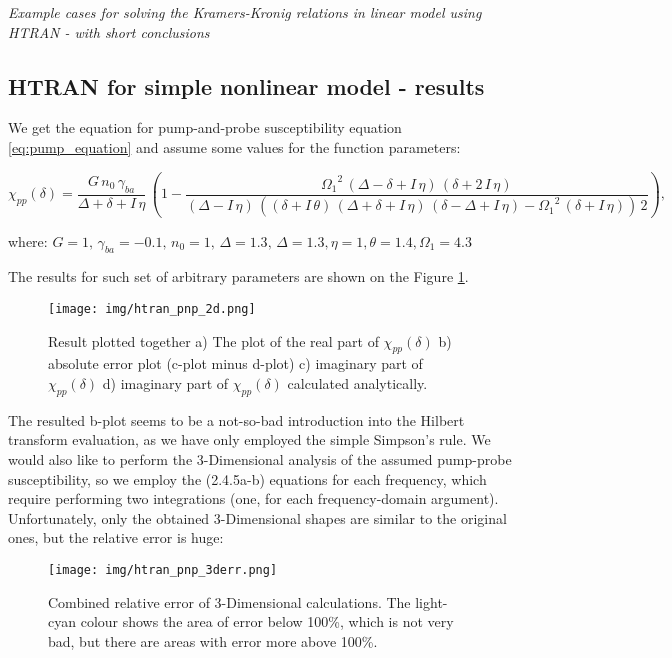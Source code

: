 \documentclass[12pt,twoside,a4paper]{article}
\numberwithin{equation}{subsection}
\numberwithin{figure}{subsection}
\begin{document}
\footnotesize{\textit{Example cases for solving the Kramers-Kronig relations in linear model using HTRAN - with short conclusions}}

\subsection{HTRAN for simple nonlinear model - results} \label{chap:htran_nlo}

We get the equation for pump-and-probe susceptibility equation \ref{eq:pump_equation} and assume some values for the function
parameters:

\begin{equation} \label{eq:htran_fparameters}
  {\chi_{pp}}(\delta )=\frac {G\,{n_{0}}\,{\gamma_{ba}}}{\Delta  + \delta  + I\,\eta } \, \left( \! 1 - \frac
  {{\Omega_{1}}^{2}\,(\Delta - \delta  + I\,\eta )\,(\delta  + 2\,I\,\eta )}{(\Delta  - I\,\eta )\,((\delta + I\,\theta )\,(\Delta 
  + \delta  + I\,\eta )\,(\delta - \Delta  + I\,\eta ) - {\Omega_{1}}^{2}\,(\delta  + I\,\eta ))\,2} \! \right) ,
\end{equation}

where: $G = 1,\,{\gamma_{ba}} = -0.1,\, {n_{0}} = 1,\,\Delta = 1.3,\,\Delta = 1.3,\eta = 1, \theta = 1.4, \Omega_{1} = 4.3$

The results for such set of arbitrary parameters are shown on the Figure \ref{fig:htran_pnp_2d}.

\begin{figure}
  \texttt{[image: img/htran\_pnp\_2d.png]}
  \caption{Result plotted together 
    a) The plot of the real part of $\chi_{pp} (\delta )$ 
    b) absolute error plot (c-plot minus d-plot) 
    c) imaginary part of $\chi_{pp} (\delta )$
    d) imaginary part of ${\chi_{pp}}(\delta )$ calculated analytically.
    \label{fig:htran_pnp_2d}}
\end{figure}

The resulted b-plot seems to be a not-so-bad introduction into the Hilbert transform evaluation, as we have only employed the
simple Simpson's rule. We would also like to perform the 3-Dimensional analysis of the assumed pump-probe susceptibility, so we
employ the (2.4.5a-b) equations for each frequency, which require performing two integrations (one, for each frequency-domain
argument). Unfortunately, only the obtained 3-Dimensional shapes are similar to the original ones, but the relative error is huge:

\begin{figure}
  \texttt{[image: img/htran\_pnp\_3derr.png]}
  \caption{Combined relative error of 3-Dimensional calculations. The light-cyan colour shows the area of error below 100\%, which is
  not very bad, but there are areas with error more above 100\%. \label{fig:htran_pnp_3derr}}
\end{figure}
\end{document}
